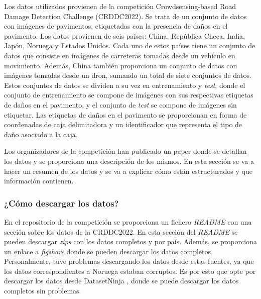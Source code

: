 Los datos utilizados provienen de la competición Crowdsensing-based Road Damage Detection Challenge (CRDDC2022)\cite{CRDDC2022_paper}. Se trata de un conjunto de datos con imágenes de pavimentos, etiquetadas con la presencia de daños en el pavimento. Los datos provienen de seis países: China, República Checa, India, Japón, Noruega y Estados Unidos. Cada uno de estos países tiene un conjunto de datos que consiste en imágenes de carreteras tomadas desde un vehículo en movimiento. Además, China también proporciona un conjunto de datos con imágenes tomadas desde un dron, sumando un total de siete conjuntos de datos. Estos conjuntos de datos se dividen a su vez en entrenamiento y \textit{test}, donde el conjunto de entrenamiento se compone de imágenes con sus respectivas etiquetas de daños en el pavimento, y el conjunto de \textit{test} se compone de imágenes sin etiquetar. Las etiquetas de daños en el pavimento se proporcionan en forma de coordenadas de caja delimitadora y un identificador que representa el tipo de daño asociado a la caja.

Los organizadores de la competición han publicado un paper \cite{RDD2022_data_paper} donde se detallan los datos y se proporciona una descripción de los mismos. En esta sección se va a hacer un resumen de los datos y se va a explicar cómo están estructurados y que información contienen.


\subsubsection{¿Cómo descargar los datos?}
En el repositorio de la competición \cite{RoadDamageDetector_repo} se proporciona un fichero \textit{README} con una sección sobre los datos de la CRDDC2022. En esta sección del \textit{README} se pueden descargar \textit{zips} con los datos completos y por país. Además, se proporciona un enlace a \textit{figshare} \cite{RDD2022_dataset} donde se pueden descargar los datos completos. Personalmente, tuve problemas descargando los datos desde estas fuentes, ya que los datos correspondientes a Noruega estaban corruptos. Es por esto que opte por descargar los datos desde DatasetNinja \cite{RDD2022_datasetNinja}, donde se puede descargar los datos completos sin problemas.


